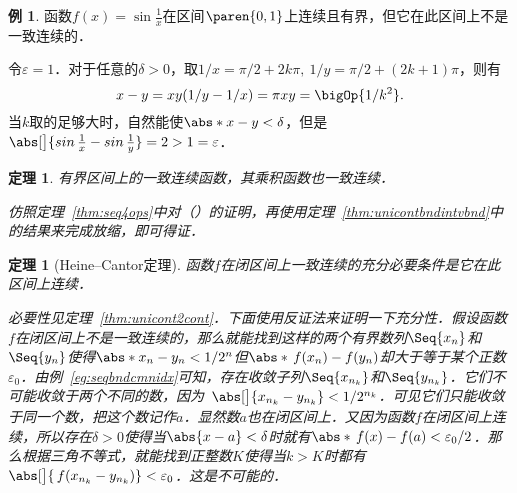\documentclass[a4paper,punct=CCT]{ctexbook}
\makeatletter
\renewcommand*{\enumparen}[1]{（\makebox[0.6em][c]{\normalfont#1}）}
\newtheorem{theorem}{定理}
\newtheorem*{theorem*}{定理}
\theoremstyle{definition}
\newtheorem{example}{例}
\theoremstyle{remark}
\renewcommand*{\proofname}{证}
\renewenvironment{proof}[1][\proofname]{\par
  \pushQED{\qed}%
  \normalfont \topsep6\p@\@plus6\p@\relax
  \trivlist
  \item[\hskip\labelsep
    \bfseries
    #1%
    ]\ignorespaces
}{%
  \popQED\endtrivlist\@endpefalse
}
\makeatother
\begin{document}
\begin{example}
  \label{eg:uniconttoposine}
  函数\(f(x) = \sin\frac1x\)在区间\(\paren{0,1}\)上连续且有界，但它在此区间上不是一致连续的．

  \begin{proof}
    令\(\varepsilon = 1\)．对于任意的\(\delta > 0\)，取\(1/x = \pi/2 + 2k\pi,\ 1/y = \pi/2 + (2k+1)\pi\)，则有
    \begin{equation*}
      x - y = xy(1/y - 1/x) = \pi xy = \bigOp{1/k^2}.
    \end{equation*}
    当\(k\)取的足够大时，自然能使\(\abs*{x-y} < \delta\)，但是\(\abs[\big]{\sin\frac1x - \sin\frac1y} = 2 > 1 = \varepsilon\)．
  \end{proof}
\end{example}

\begin{theorem*}
  有界区间上的一致连续函数，其乘积函数也一致连续．

  \begin{proof}
    仿照定理~\ref{thm:seq4ops}中对\enumparen{2}的证明，再使用定理~\ref{thm:unicontbndintvbnd}中的结果来完成放缩，即可得证．
  \end{proof}
\end{theorem*}

\begin{theorem}[Heine--Cantor定理]
  \label{thm:hc}
  函数\(f\)在闭区间上一致连续的充分必要条件是它在此区间上连续．

  \begin{proof}
    必要性见定理~\ref{thm:unicont2cont}．下面使用反证法来证明一下充分性．假设函数\(f\)在闭区间上不是一致连续的，那么就能找到这样的两个有界数列\(\Seq{x_n}\)和\(\Seq{y_n}\)使得\(\abs*{x_n - y_n} < 1/2^n\)但\(\abs*{\,f(x_n) - f(y_n)}\)却大于等于某个正数\(\varepsilon_0\)．由例~\ref{eg:seqbndcmnidx}可知，存在收敛子列\(\Seq{x_{n_k}}\)和\(\Seq{y_{n_k}}\)．它们不可能收敛于两个不同的数，因为~\(\abs[\big]{x_{n_k} - y_{n_k}} < 1/2^{n_k}\)．可见它们只能收敛于同一个数，把这个数记作\(a\)．显然数\(a\)也在闭区间上．又因为函数\(f\)在闭区间上连续，所以存在\(\delta > 0\)使得当\(\abs{x-a} < \delta\)时就有\(\abs*{\,f(x)-f(a)} < \varepsilon_0/2\)．那么根据三角不等式，就能找到正整数\(K\)使得当\(k > K\)时都有\(\abs[\big]{\,f(x_{n_k} - y_{n_k})} < \varepsilon_0\)．这是不可能的．
  \end{proof}
\end{theorem}
\end{document}
